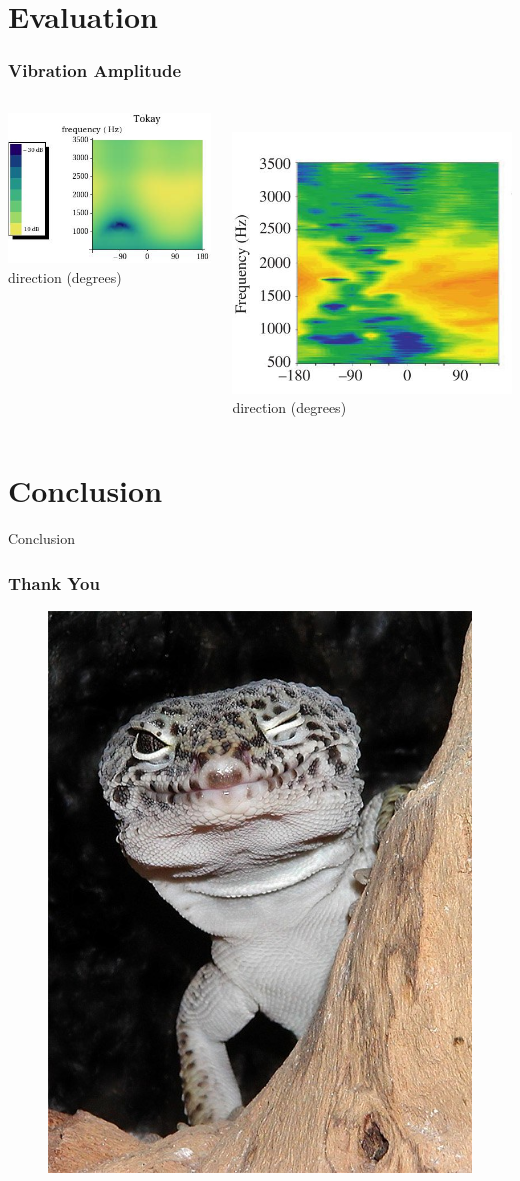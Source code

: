 \documentclass{beamer}
\let\oldfootnotesize\footnotesize
\renewcommand*{\footnotesize}{\oldfootnotesize\tiny}
\begin{document}
\section{Evaluation}
\begin{frame}[t]
\frametitle{Vibration Amplitude}
\begin{columns}
    \begin{column}{0.5\textwidth}
      \centering
      \includegraphics[width = 5.6 cm]{Diagrams/Plots/tokayvibamp.jpeg}\\
     
      \footnotesize \hspace{4pt} direction (degrees)
    \end{column}

    \begin{column}{0.5\textwidth}
    \textbf{}\\
    \vspace{1pt}
    \flushright
      \includegraphics[width = 4.25 cm]{Diagrams/Plots/tokayvibamp_exp.jpeg}\\
      \centering
      \footnotesize direction (degrees)
    \end{column}
  \end{columns}
\end{frame}

\section{Conclusion}
\begin{frame}[t]
 Conclusion
\end{frame}

\begin{frame}[t]
 \frametitle{Thank You}
 \begin{figure}
  \centering
  \includegraphics[width=.3\textwidth]{Diagrams/geckowink.jpg}
 \end{figure}
\end{frame}
\end{document}
